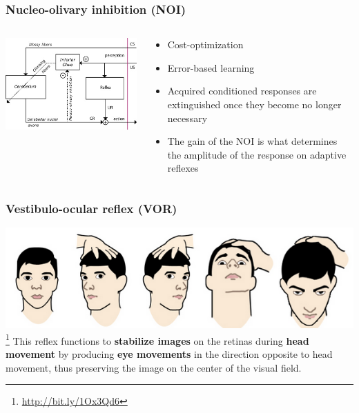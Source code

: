 \documentclass[10pt, compress]{beamer}
\begin{document}
\begin{frame}[fragile]
  \frametitle{Nucleo-olivary inhibition (NOI)}
  \begin{columns}[T]
    \begin{column}[T]{5cm}
      \includegraphics[scale=0.6]{images/noi.jpg}
    \end{column}
    \begin{column}[T]{5cm}
      \begin{itemize}
        \item Cost-optimization
        \item Error-based learning
        \item Acquired conditioned responses are extinguished once they become no longer necessary
        \item The gain of the NOI is what determines the amplitude of the response on adaptive reflexes
      \end{itemize}
    \end{column}
  \end{columns}
  \cite{Herreros2013b}
\end{frame}


\begin{frame}[fragile]
  \frametitle{Vestibulo-ocular reflex (VOR)}
  \includegraphics[scale=0.5]{images/vor.png}
  \footnote{\url{http://bit.ly/1Ox3Qd6}}
  This reflex functions to \textbf{stabilize images} on the retinas during \textbf{head movement} by producing \textbf{eye movements} in the direction opposite to head movement, thus preserving the image on the center of the visual field.
\end{frame}
\end{document}
